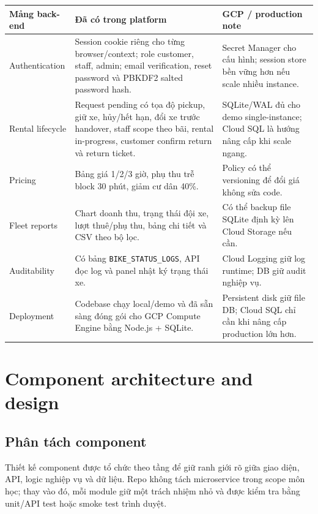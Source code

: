 \begin{longtable}{P{0.22\textwidth}P{0.38\textwidth}P{0.30\textwidth}}
\toprule
\textbf{Mảng back-end} & \textbf{Đã có trong platform} & \textbf{GCP / production note} \\
\midrule
Authentication & Session cookie riêng cho từng browser/context; role customer, staff, admin; email verification, reset password và PBKDF2 salted password hash. & Secret Manager cho cấu hình; session store bền vững hơn nếu scale nhiều instance. \\
Rental lifecycle & Request pending có tọa độ pickup, giữ xe, hủy/hết hạn, đổi xe trước handover, staff scope theo bãi, rental in-progress, customer confirm return và return ticket. & SQLite/WAL đủ cho demo single-instance; Cloud SQL là hướng nâng cấp khi scale ngang. \\
Pricing & Bảng giá 1/2/3 giờ, phụ thu trễ block 30 phút, giảm cư dân 40\%. & Policy có thể versioning để đổi giá không sửa code. \\
Fleet reports & Chart doanh thu, trạng thái đội xe, lượt thuê/phụ thu, bảng chi tiết và CSV theo bộ lọc. & Có thể backup file SQLite định kỳ lên Cloud Storage nếu cần. \\
Auditability & Có bảng \texttt{BIKE\_STATUS\_LOGS}, API đọc log và panel nhật ký trạng thái xe. & Cloud Logging giữ log runtime; DB giữ audit nghiệp vụ. \\
Deployment & Codebase chạy local/demo và đã sẵn sàng đóng gói cho GCP Compute Engine bằng Node.js + SQLite. & Persistent disk giữ file DB; Cloud SQL chỉ cần khi nâng cấp production lớn hơn. \\
\bottomrule
\end{longtable}

\section{Component architecture and design}

\subsection{Phân tách component}
Thiết kế component được tổ chức theo tầng để giữ ranh giới rõ giữa giao diện,
API, logic nghiệp vụ và dữ liệu. Repo không tách microservice trong scope môn
học; thay vào đó, mỗi module giữ một trách nhiệm nhỏ và được kiểm tra bằng
unit/API test hoặc smoke test trình duyệt.

